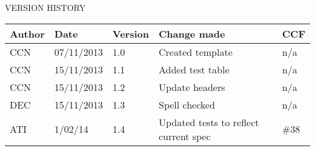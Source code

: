 \documentclass{article}
\begin{document}
	\vspace{1cm}
	\begin{section}{VERSION HISTORY}
		\begin{tabularx}{\linewidth}{| p{2cm} | p{2cm} | p{2cm} | X | p{1cm} |}
			\hline
			\bf{Author} & \bf{Date} & \bf{Version} & \bf{Change made} & {\bf CCF} \\
			\hline
			CCN & 07/11/2013 & 1.0 & Created template & n/a \\
			\hline
			CCN & 15/11/2013 & 1.1 & Added test table & n/a \\
			\hline
			CCN & 15/11/2013 & 1.2 & Update headers & n/a \\
			\hline
			DEC & 15/11/2013 & 1.3 & Spell checked & n/a \\
			\hline
			ATI & 1/02/14 & 1.4 & Updated tests to reflect current spec & \#38 \\
			\hline
		\end{tabularx}
	\end{section}
\end{document}
